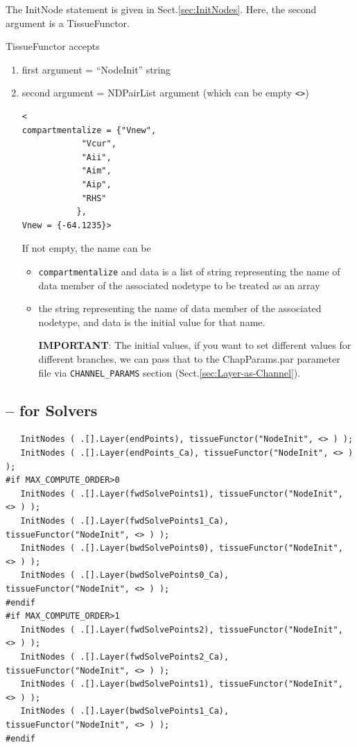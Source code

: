 The InitNode statement is given in Sect.\ref{sec:InitNodes}. Here, the second
argument is a TissueFunctor.

TissueFunctor accepts
\begin{enumerate}
  \item first argument = ``NodeInit'' string
  \item second argument = NDPairList argument (which can be empty \verb!<>!)

\begin{verbatim}
<
compartmentalize = {"Vnew", 
		    "Vcur", 
		    "Aii", 
		    "Aim", 
		    "Aip", 
		    "RHS"
		   },
Vnew = {-64.1235}>
\end{verbatim}

If not empty, the name can be
\begin{itemize}
  \item \verb!compartmentalize! and
data is a list of string representing the name of data member of the associated nodetype to be
treated as an array

  \item the string representing the name of data member of the associated
  nodetype, and data is the initial value for that name.

{\bf IMPORTANT}: The initial values, if you want to set different values for
different branches, we can pass that to the ChapParams.par parameter file via
\verb!CHANNEL_PARAMS! section (Sect.\ref{sec:Layer-as-Channel}).
\end{itemize}

\end{enumerate}

\subsection{-- for Solvers}

\begin{verbatim}
   InitNodes ( .[].Layer(endPoints), tissueFunctor("NodeInit", <> ) );
   InitNodes ( .[].Layer(endPoints_Ca), tissueFunctor("NodeInit", <> ) );
#if MAX_COMPUTE_ORDER>0
   InitNodes ( .[].Layer(fwdSolvePoints1), tissueFunctor("NodeInit", <> ) );
   InitNodes ( .[].Layer(fwdSolvePoints1_Ca), tissueFunctor("NodeInit", <> ) );
   InitNodes ( .[].Layer(bwdSolvePoints0), tissueFunctor("NodeInit", <> ) );
   InitNodes ( .[].Layer(bwdSolvePoints0_Ca), tissueFunctor("NodeInit", <> ) );
#endif
#if MAX_COMPUTE_ORDER>1
   InitNodes ( .[].Layer(fwdSolvePoints2), tissueFunctor("NodeInit", <> ) );
   InitNodes ( .[].Layer(fwdSolvePoints2_Ca), tissueFunctor("NodeInit", <> ) );
   InitNodes ( .[].Layer(bwdSolvePoints1), tissueFunctor("NodeInit", <> ) );
   InitNodes ( .[].Layer(bwdSolvePoints1_Ca), tissueFunctor("NodeInit", <> ) );
#endif
\end{verbatim}

